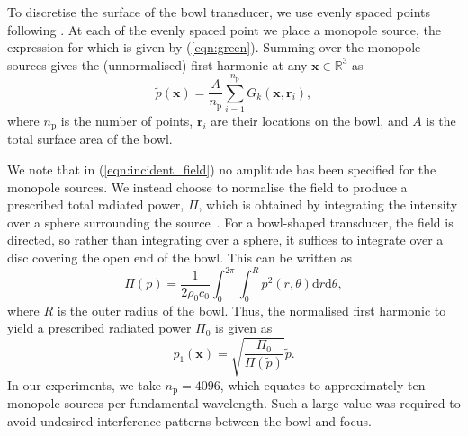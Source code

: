 \documentclass[11pt]{article}
\numberwithin{equation}{section}
\newcommand{\br}{\mathbf{r}}
\newcommand{\sd}{\mbox{d}}
\newcommand{\bx}{\mathbf{x}}
\newcommand{\red}[1]{{\color{black} #1}}
\begin{document}
To discretise the surface of the bowl transducer, we use evenly spaced points
following \cite{deserno2004generate}. At each of the evenly spaced point we 
place a monopole source, the expression for which is given by (\ref{eqn:green}). 
Summing over the monopole sources gives the (unnormalised) first harmonic at any 
$\bx\in\mathbb{R}^3$ as
\begin{equation}
    \tilde{p}(\bx) = \frac{A}{n_{\text{p}}}\sum_{i=1}^{n_{\text{p}}}G_k(\bx,\br_i),
    \label{eqn:incident_field}
\end{equation}
where $n_{\text{p}}$ is the number of points, $\br_i$ are their locations on the bowl,
and $A$ is the total surface area of the bowl.

We note that in (\ref{eqn:incident_field}) no amplitude has been specified for the 
monopole sources. We instead choose to normalise the field to produce a prescribed 
total radiated power, $\Pi$, which is obtained by integrating the intensity over 
a sphere surrounding the source~\cite{kinsler1999fundamentals}. For a bowl-shaped 
transducer, the field is directed, so rather than integrating over a sphere, 
it suffices to integrate over a disc covering the open end of the bowl. This 
can be written as
\begin{equation}
    \Pi(p) = \frac{1}{2\rho_0 c_0}\int_{0}^{2\pi}\int_{0}^R 
    p^2(r,\theta)\sd r \sd \theta,
\end{equation}
where $R$ is the outer radius of the bowl. Thus, the normalised first harmonic 
to yield a prescribed radiated power $\Pi_0$ is given as 
\begin{equation}
    p_1(\bx) = \sqrt{\frac{\Pi_0}{\Pi(\tilde{p})}}\tilde{p}.
\end{equation}
In our experiments, we take $n_{\text{p}}=4096$, \red{which equates to approximately 
ten monopole sources per fundamental wavelength}. Such a large value was required 
to avoid undesired interference patterns between the bowl and focus.
\end{document}
